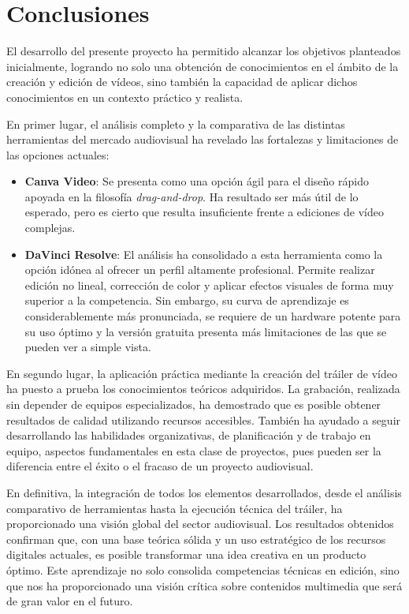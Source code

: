 \section{Conclusiones}

El desarrollo del presente proyecto ha permitido alcanzar los objetivos planteados inicialmente, 
logrando no solo una obtención de conocimientos en 
el ámbito de la creación y edición de vídeos, sino también la capacidad de aplicar
dichos conocimientos en un contexto práctico y realista.


En primer lugar, el análisis completo y la comparativa de las distintas herramientas
del mercado audiovisual ha revelado las fortalezas y limitaciones de las opciones actuales:
\begin{itemize}
    \item \textbf{Canva Video}: Se presenta como una opción ágil para el diseño rápido 
    apoyada en la filosofía \textit{drag-and-drop}. Ha resultado ser más útil de lo 
    esperado, pero es cierto que resulta insuficiente frente a ediciones de vídeo complejas.
    \item \textbf{DaVinci Resolve}: El análisis ha consolidado a esta herramienta como la
    opción idónea al ofrecer un perfil altamente profesional. Permite realizar edición no 
    lineal, corrección de color y aplicar efectos visuales de forma muy superior a la
    competencia. Sin embargo, su curva de aprendizaje es considerablemente más pronunciada,
    se requiere de un hardware potente para su uso óptimo y la versión gratuita presenta
    más limitaciones de las que se pueden ver a simple vista.
\end{itemize}

En segundo lugar, la aplicación práctica mediante la creación del tráiler de vídeo ha 
puesto a prueba los conocimientos teóricos adquiridos. La grabación, realizada sin depender
de equipos especializados, ha demostrado que es posible obtener 
resultados de calidad utilizando recursos accesibles. También ha ayudado a seguir
desarrollando las habilidades organizativas, de planificación y de trabajo en equipo, 
aspectos fundamentales en esta clase de proyectos, pues pueden ser la diferencia entre el
 éxito o el fracaso de un proyecto audiovisual.

En definitiva, la integración de todos los elementos desarrollados, desde el análisis
comparativo de herramientas hasta la ejecución técnica del tráiler, ha proporcionado una 
visión global del sector audiovisual. Los resultados obtenidos confirman 
que, con una base teórica sólida y un uso estratégico de los recursos digitales actuales,
es posible transformar una idea creativa en un producto óptimo. Este aprendizaje no solo consolida competencias técnicas en 
edición, sino que nos ha proporcionado una visión crítica sobre contenidos multimedia que será de
gran valor en el futuro.